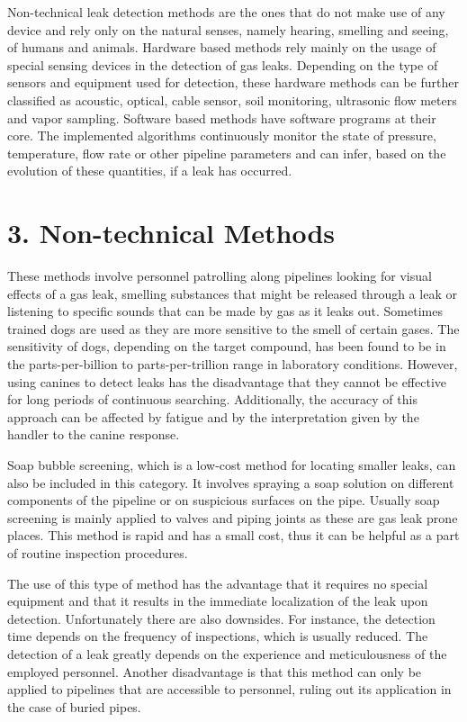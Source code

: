 Non-technical leak detection methods are the ones that do not make use of any device and rely only on the natural senses, namely hearing, smelling and seeing, of humans and animals. Hardware based methods rely mainly on the usage of special sensing devices in the detection of gas leaks. Depending on the type of sensors and equipment used for detection, these hardware methods can be further classified as acoustic, optical, cable sensor, soil monitoring, ultrasonic flow meters and vapor sampling. Software based methods have software programs at their core. The implemented algorithms continuously monitor the state of pressure, temperature, flow rate or other pipeline parameters and can infer, based on the evolution of these quantities, if a leak has occurred.

\section*{3. Non-technical Methods}

These methods involve personnel patrolling along pipelines looking for visual effects of a gas leak, smelling substances that might be released through a leak or listening to specific sounds that can be made by gas as it leaks out. Sometimes trained dogs are used as they are more sensitive to the smell of certain gases. The sensitivity of dogs, depending on the target compound, has been found to be in the parts-per-billion to parts-per-trillion range in laboratory conditions. However, using canines to detect leaks has the disadvantage that they cannot be effective for long periods of continuous searching. Additionally, the accuracy of this approach can be affected by fatigue and by the interpretation given by the handler to the canine response.

Soap bubble screening, which is a low-cost method for locating smaller leaks, can also be included in this category. It involves spraying a soap solution on different components of the pipeline or on suspicious surfaces on the pipe. Usually soap screening is mainly applied to valves and piping joints as these are gas leak prone places. This method is rapid and has a small cost, thus it can be helpful as a part of routine inspection procedures.

The use of this type of method has the advantage that it requires no special equipment and that it results in the immediate localization of the leak upon detection. Unfortunately there are also downsides. For instance, the detection time depends on the frequency of inspections, which is usually reduced. The detection of a leak greatly depends on the experience and meticulousness of the employed personnel. Another disadvantage is that this method can only be applied to pipelines that are accessible to personnel, ruling out its application in the case of buried pipes.

